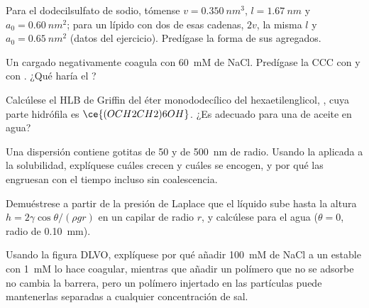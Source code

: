 \begin{exercise}[$\star\star$]\label{exo:b3:colloids:7}
Para el dodecilsulfato de sodio, tómense $v = \qty{0.350}{nm^3}$, $l = \qty{1.67}{nm}$ y $a_0 = \qty{0.60}{nm^2}$; para un
lípido con dos de esas cadenas, $2v$, la misma $l$ y $a_0 = \qty{0.65}{nm^2}$ (datos del
ejercicio). Predígase la forma de sus agregados.
\end{exercise}

\begin{exercise}[$\star\star$]\label{exo:b3:colloids:8}
Un  cargado negativamente coagula con \qty{60}{mM} de NaCl. Predígase la CCC con 
y con . ¿Qué haría el ?
\end{exercise}

\begin{exercise}[$\star\star$]\label{exo:b3:colloids:9}
Calcúlese el HLB de Griffin del éter monododecílico del hexaetilenglicol,
, cuya parte hidrófila es $\ce{(OCH2CH2)6OH}$. ¿Es adecuado para una
 de aceite en agua?
\end{exercise}

\begin{exercise}[$\star\star\star$]\label{exo:b3:colloids:10}
Una dispersión contiene gotitas de 50 y de \qty{500}{nm} de radio. Usando la  aplicada a la solubilidad, explíquese cuáles crecen y cuáles se encogen, y por qué
las  engruesan con el tiempo incluso sin coalescencia.
\end{exercise}

\begin{exercise}[$\star\star\star$]\label{exo:b3:colloids:11}
Demuéstrese a partir de la presión de Laplace que el líquido sube hasta la altura $h = 2\gamma\cos\theta/(\rho gr)$ en un
capilar de radio $r$, y calcúlese para el agua ($\theta = 0$, radio de \qty{0.10}{mm}).
\end{exercise}

\begin{exercise}[$\star\star\star$]\label{exo:b3:colloids:12}
Usando la figura DLVO, explíquese por qué añadir \qty{100}{mM} de NaCl a un  estable con \qty{1}{mM}
lo hace coagular, mientras que añadir un polímero que no se adsorbe no cambia la
barrera, pero un polímero injertado en las partículas puede mantenerlas separadas a cualquier
concentración de sal.
\end{exercise}

